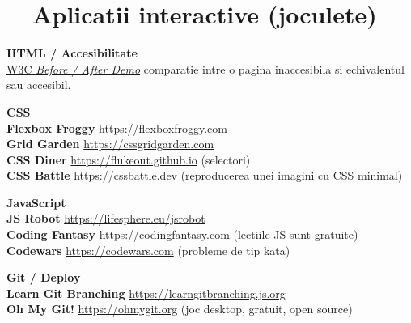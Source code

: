 \section{\faGamepad\ \ Aplicatii interactive (joculete)}

\begin{tcolorbox}[
  enhanced, colback=themeHtml!8, colframe=themeHtml, boxrule=0pt, leftrule=4pt,
  arc=4pt, sharp corners=downhill, rounded corners=northwest,
  left=12pt, right=12pt, top=8pt, bottom=8pt,
]
\textbf{\color{themeHtml}HTML / Accesibilitate}\\
\href{https://www.w3.org/WAI/demos/bad/}{W3C \emph{Before / After Demo}} \textendash{} comparatie intre o pagina inaccesibila si echivalentul sau accesibil.
\end{tcolorbox}

\begin{tcolorbox}[
  enhanced, colback=themeCss!8, colframe=themeCss, boxrule=0pt, leftrule=4pt,
  arc=4pt, sharp corners=downhill, rounded corners=northwest,
  left=12pt, right=12pt, top=8pt, bottom=8pt,
]
\textbf{\color{themeCss}CSS}\\
\textbf{Flexbox Froggy} \textendash{} \url{https://flexboxfroggy.com}\\
\textbf{Grid Garden} \textendash{} \url{https://cssgridgarden.com}\\
\textbf{CSS Diner} \textendash{} \url{https://flukeout.github.io} (selectori)\\
\textbf{CSS Battle} \textendash{} \url{https://cssbattle.dev} (reproducerea unei imagini cu CSS minimal)
\end{tcolorbox}

\begin{tcolorbox}[
  enhanced, colback=themeJs!8, colframe=themeJs, boxrule=0pt, leftrule=4pt,
  arc=4pt, sharp corners=downhill, rounded corners=northwest,
  left=12pt, right=12pt, top=8pt, bottom=8pt,
]
\textbf{\color{themeJs}JavaScript}\\
\textbf{JS Robot} \textendash{} \url{https://lifesphere.eu/jsrobot}\\
\textbf{Coding Fantasy} \textendash{} \url{https://codingfantasy.com} (lectiile JS sunt gratuite)\\
\textbf{Codewars} \textendash{} \url{https://codewars.com} (probleme de tip kata)
\end{tcolorbox}

\begin{tcolorbox}[
  enhanced, colback=themeDeploy!8, colframe=themeDeploy, boxrule=0pt, leftrule=4pt,
  arc=4pt, sharp corners=downhill, rounded corners=northwest,
  left=12pt, right=12pt, top=8pt, bottom=8pt,
]
\textbf{\color{themeDeploy}Git / Deploy}\\
\textbf{Learn Git Branching} \textendash{} \url{https://learngitbranching.js.org}\\
\textbf{Oh My Git!} \textendash{} \url{https://ohmygit.org} (joc desktop, gratuit, open source)
\end{tcolorbox}

